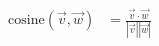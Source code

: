 \documentclass[preview]{standalone}
\begin{document}
\begin{align*}
\text{cosine}(\vec{v}, \vec{w}) &= \frac{\vec{v} \cdot \vec{w}}{|\vec{v}| |\vec{w}|}\\
\end{align*}
\end{document}
